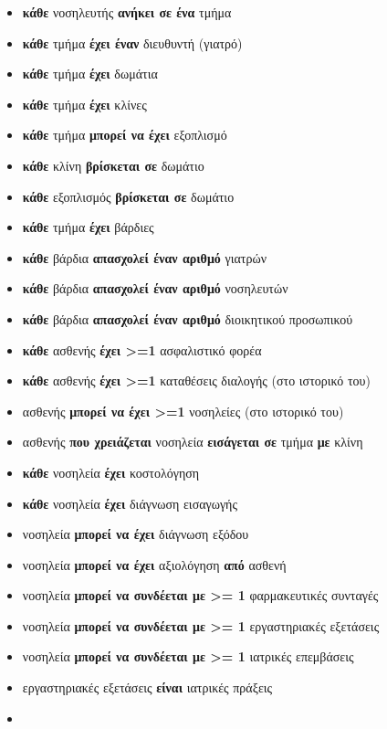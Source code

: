 \documentclass[13pt]{article}
\begin{document}
\begin{itemize}
\item
  \textbf{κάθε} νοσηλευτής \textbf{ανήκει σε
  ένα} τμήμα
\item
  \textbf{κάθε} τμήμα \textbf{έχει έναν} διευθυντή (γιατρό)
\item
  \textbf{κάθε} τμήμα \textbf{έχει} δωμάτια
\item
  \textbf{κάθε} τμήμα \textbf{έχει} κλίνες
\item
  \textbf{κάθε} τμήμα \textbf{μπορεί να έχει} εξοπλισμό 
\item
  \textbf{κάθε} κλίνη \textbf{βρίσκεται σε} δωμάτιο
\item
  \textbf{κάθε} εξοπλισμός \textbf{βρίσκεται σε} δωμάτιο
\item
    \textbf{κάθε} τμήμα \textbf{έχει} βάρδιες
\item
    \textbf{κάθε} βάρδια \textbf{απασχολεί έναν αριθμό} γιατρών
\item
    \textbf{κάθε} βάρδια \textbf{απασχολεί έναν αριθμό} νοσηλευτών 
\item
    \textbf{κάθε} βάρδια \textbf{απασχολεί έναν αριθμό} διοικητικού προσωπικού
\item
  \textbf{κάθε} ασθενής \textbf{έχει \textgreater=1} ασφαλιστικό φορέα
\item
    \textbf{κάθε} ασθενής \textbf{έχει \textgreater=1} καταθέσεις διαλογής (στο ιστορικό
  του)
\item
  ασθενής \textbf{μπορεί να έχει \textgreater=1} νοσηλείες (στο ιστορικό
  του)
\item
  ασθενής \textbf{που χρειάζεται} νοσηλεία \textbf{εισάγεται σε} τμήμα
  \textbf{με} κλίνη
\item
    \textbf{κάθε} νοσηλεία \textbf{έχει} κοστολόγηση
\item
    \textbf{κάθε} νοσηλεία \textbf{έχει} διάγνωση εισαγωγής
\item
    νοσηλεία \textbf{μπορεί να έχει} διάγνωση εξόδου
\item
    νοσηλεία \textbf{μπορεί να έχει} αξιολόγηση \textbf{από} ασθενή 
\item
  νοσηλεία \textbf{μπορεί να συνδέεται με \textgreater= 1}
  φαρμακευτικές συνταγές
\item
  νοσηλεία \textbf{μπορεί να συνδέεται με \textgreater= 1}
  εργαστηριακές εξετάσεις
\item
  νοσηλεία \textbf{μπορεί να συνδέεται με \textgreater= 1}
  ιατρικές επεμβάσεις
\item
    εργαστηριακές εξετάσεις \textbf{είναι} ιατρικές πράξεις
\item

\end{itemize}
\end{document}

